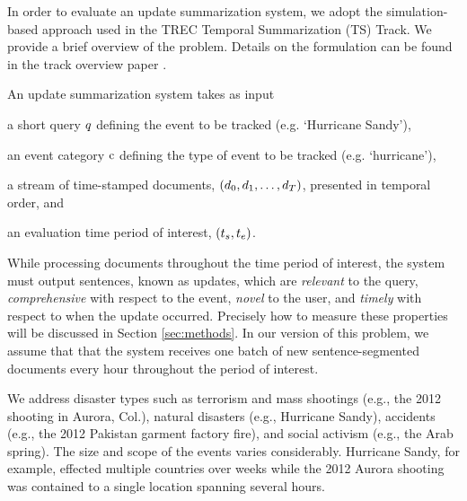 In order to evaluate an update summarization system, we adopt the simulation-based approach used in the TREC Temporal Summarization (TS) Track.  We provide a brief overview of the problem.  Details on the formulation can be found in the track overview paper \cite{aslam2013trec}.  

An update summarization system takes as input 
\begin{enumerate*}[label=\itshape\alph*\upshape)]
  \item a short query $q$ defining the event to be tracked (e.g. `Hurricane Sandy'), 
  \item an event category $\operatorname{c}$ defining the type of event to be tracked (e.g. `hurricane'), 
  \item a stream of time-stamped documents, $(\operatorname{\mathnormal{d}}_0, \operatorname{\mathnormal{d}}_1,\ldots,\operatorname{\mathnormal{d}}_T)$,
  presented in temporal order, and \item an evaluation time period of interest,
      $(t_s,t_e)$.  \end{enumerate*} While processing documents
      throughout the time period of interest, the system must output sentences,
      known as updates, which are \emph{relevant} to the query,
      \emph{comprehensive} with respect to the event, \emph{novel} to the user,
      and \emph{timely} with respect to when the update occurred.  Precisely
      how to measure these properties will be discussed in Section
      \ref{sec:methods}.  In our version of this problem, we assume that that
      the system receives one batch of new sentence-segmented documents every
      hour throughout the period of interest.

We address disaster types such as terrorism and mass shootings (e.g., the 2012
shooting in Aurora, Col.), natural disasters (e.g., Hurricane Sandy), accidents
(e.g., the 2012 Pakistan garment factory fire), and social activism (e.g., the
Arab spring). The size and scope of the events varies considerably. Hurricane
Sandy, for example, effected multiple countries over weeks while the
2012 Aurora shooting was contained to a single location spanning several hours.


